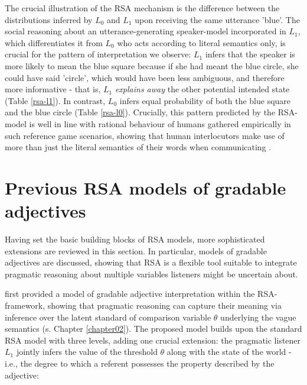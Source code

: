 The crucial illustration of the RSA mechanism is the difference between the distributions inferred by $L_0$ and $L_1$ upon receiving the same utterance 'blue'. The social reasoning about an utterance-generating speaker-model incorporated in $L_1$, which differentiates it from $L_0$ who acts according to literal semantics only, is crucial for the pattern of interpretation we observe: $L_1$ infers that the speaker is more likely to mean the blue square because if she had meant the blue circle, she could have said 'circle', which would have been less ambiguous, and therefore more informative - that is, $L_1$ \emph{explains away} the other potential intended state (Table \ref{rsa-l1}). In contrast, $L_0$ infers equal probability of both the blue square and the blue circle (Table \ref{rsa-l0}). Crucially, this pattern predicted by the RSA-model is well in line with rational behaviour of humans gathered empirically in such reference game scenarios, showing that human interlocutors make use of more than just the literal semantics of their words when communicating \parencite{frank2012predicting, problang}.

\section{Previous RSA models of gradable adjectives}
Having set the basic building blocks of RSA models, more sophisticated extensions are reviewed in this section. In particular, models of gradable adjectives are discussed, showing that RSA is a flexible tool suitable to integrate pragmatic reasoning about multiple variables listeners might be uncertain about.

\textcite{lassiter2013context} first provided a model of gradable adjective interpretation within the RSA-framework, showing that pragmatic reasoning can capture their meaning via inference over the latent standard of comparison variable $\theta$ underlying the vague semantics (s. Chapter \ref{chapter02}). %
The proposed model builds upon the standard RSA model with three levels, adding one crucial extension: the pragmatic listener $L_1$ jointly infers the value of the threshold $\theta$ along with the state of the world - i.e., the degree to which a referent possesses the property described by the adjective:

